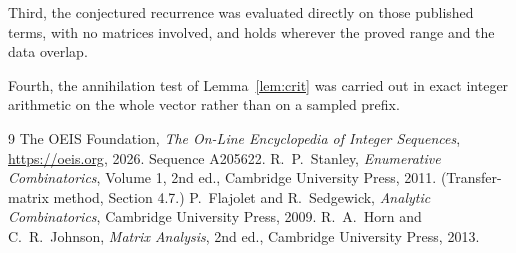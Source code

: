 \documentclass[11pt,a4paper]{article}
\theoremstyle{plain}
\theoremstyle{definition}
\begin{document}
Third, the conjectured recurrence was evaluated directly on those published terms, with no
matrices involved, and holds wherever the proved range and the data overlap.

Fourth, the annihilation test of Lemma~\ref{lem:crit} was carried out in exact integer
arithmetic on the whole vector rather than on a sampled prefix.

\begin{thebibliography}{9}
 The OEIS Foundation, \emph{The On-Line Encyclopedia of Integer
Sequences}, \url{https://oeis.org}, 2026. Sequence A205622.
 R.~P.~Stanley, \emph{Enumerative Combinatorics}, Volume 1, 2nd ed.,
Cambridge University Press, 2011. (Transfer-matrix method, Section 4.7.)
 P.~Flajolet and R.~Sedgewick, \emph{Analytic Combinatorics}, Cambridge
University Press, 2009.
 R.~A.~Horn and C.~R.~Johnson, \emph{Matrix Analysis}, 2nd ed., Cambridge
University Press, 2013.
\end{thebibliography}
\end{document}
